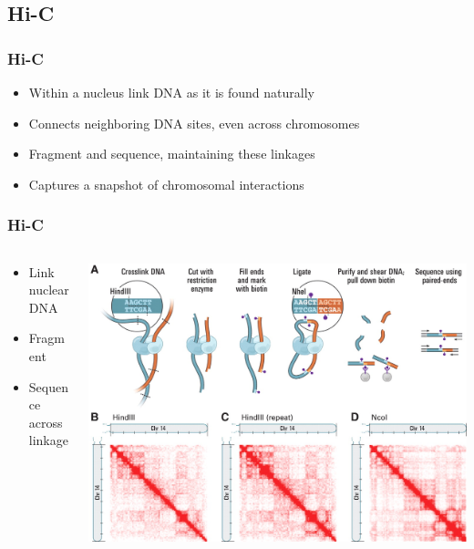 \documentclass[14pt,handout]{beamer}
\begin{document}
\subsection{Hi-C}

\begin{frame}
\frametitle{Hi-C}
\begin{itemize}
	\item<+-> Within a nucleus link DNA as it is found naturally
	\item<+-> Connects neighboring DNA sites, even across chromosomes
	\item<+-> Fragment and sequence, maintaining these linkages
	\item<+-> Captures a snapshot of chromosomal interactions
\end{itemize}
\end{frame}

\begin{frame}
\frametitle{Hi-C}
\begin{columns}
	\begin{column}{0.3\textwidth}
		\begin{itemize}
			\item<+-> Link nuclear DNA
			\item<+-> Fragment
			\item<+-> Sequence across linkage
		\end{itemize}
		\end{column}
	\begin{column}{0.7\textwidth}
		\begin{center}
     		\includegraphics[width=1\textwidth]{images_20171024_hic.jpg}
     	\end{center}
	\end{column}
\end{columns}
\end{frame}
\end{document}
